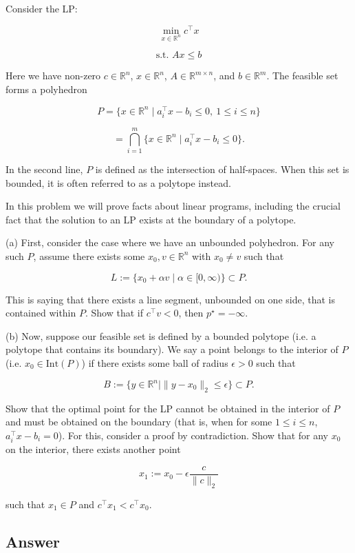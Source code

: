 \documentclass[
	12pt,
]{fphw}
\begin{document}
Consider the LP:

\[
\min_{x \in \mathbb{R}^n} c^\top x \tag{3}
\]

\[
\text{s.t. } Ax \le b \tag{4}
\]

Here we have non-zero \(c \in \mathbb{R}^n\), \(x \in \mathbb{R}^n\), \(A \in \mathbb{R}^{m\times n}\), and \(b \in \mathbb{R}^m\).
The feasible set forms a polyhedron

\[
P = \{x \in \mathbb{R}^n \mid a_i^\top x - b_i \le 0,\ 1 \le i \le n\} \tag{5}
\]

\[
= \bigcap_{i=1}^{m} \{x \in \mathbb{R}^n \mid a_i^\top x - b_i \le 0\}. \tag{6}
\]

In the second line, \(P\) is defined as the intersection of half-spaces.
When this set is bounded, it is often referred to as a polytope instead.

In this problem we will prove facts about linear programs, including the crucial fact that the solution to an LP
exists at the boundary of a polytope.

(a) First, consider the case where we have an unbounded polyhedron.
For any such \(P\), assume there exists some \(x_0, v \in \mathbb{R}^n\) with \(x_0 \ne v\) such that

\[
L := \{x_0 + \alpha v \mid \alpha \in [0,\infty)\} \subset P .
\]

This is saying that there exists a line segment, unbounded on one side, that is contained within \(P\).
Show that if \(c^\top v < 0\), then \(p^\star = -\infty\).

(b) Now, suppose our feasible set is defined by a bounded polytope (i.e. a polytope that contains its boundary).
We say a point belongs to the interior of \(P\) (i.e. \(x_0 \in \text{Int}(P)\)) if there exists some ball of radius
\(\epsilon > 0\) such that

\[
B := \{y \in \mathbb{R}^n \mid \|y - x_0\|_2 \le \epsilon\} \subset P .
\]

Show that the optimal point for the LP cannot be obtained in the interior of \(P\) and must be obtained on the
boundary (that is, when for some \(1 \le i \le n\), \(a_i^\top x - b_i = 0\)).
For this, consider a proof by contradiction. Show that for any \(x_0\) on the interior, there exists another point

\[
x_1 := x_0 - \epsilon \frac{c}{\|c\|_2} \tag{7}
\]

such that \(x_1 \in P\) and \(c^\top x_1 < c^\top x_0\).

\subsection*{Answer}
\end{document}
